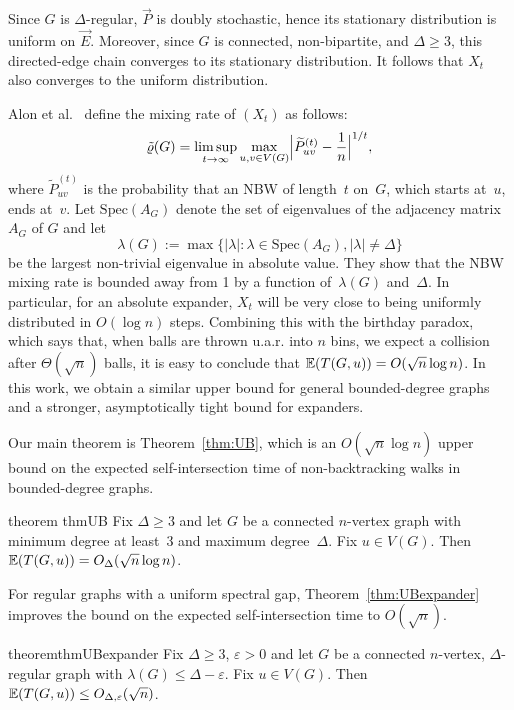 \documentclass[11pt,a4paper]{article}
\theoremstyle{plain}
\newcommand{\Exp}{\mathop{\null\mathbb{E}}}
\let\rho=\varrho
\newcommand{\Ptilde}{\widetilde P}
\let\eps=\varepsilon
\begin{document}
Since \(G\) is \(\Delta\)-regular, \(\vec P\) is doubly stochastic, hence its stationary
distribution is uniform on \(\vec E\). Moreover, since \(G\) is connected,
non-bipartite, and \(\Delta\ge 3\), this directed-edge chain converges to its stationary distribution. It follows that $X_t$ also converges to the uniform distribution.



Alon et al.~\cite{ABLS} define the mixing 
rate of $(X_t)$ as follows:
\begin{equation}\label{eq:intro-mixrate}
\tilde\rho(G)=\limsup_{t\to\infty}\max_{u,v\in V(G)}\Bigl|\Ptilde_{uv}^{(t)}-\frac1n\Bigr|^{1/t},
\end{equation}
where $\Ptilde^{(t)}_{uv}$ is the probability that an NBW of length~$t$ on~$G$, which starts at~$u$, ends at~$v$. Let 
$
\textrm{Spec}(A_G)
$
denote the set of eigenvalues of the adjacency matrix $A_G$ of $G$ and let 
\[
\lambda(G):=\max \{|\lambda|: \lambda\in \textrm{Spec}(A_G), |\lambda|\not=\Delta\}
\]
be the largest non-trivial eigenvalue in absolute value. 
They show that the NBW mixing rate is bounded away from 1 by a function of~$\lambda(G)$ and~$\Delta$. In particular, for an absolute expander, $X_t$ will be very close to being uniformly distributed in $O(\log n)$ steps. Combining this with the birthday paradox, which says that, when balls are thrown u.a.r.\null{} into $n$ bins, we expect a collision after $\Theta(\sqrt{n})$ balls, it is easy to conclude that $\Exp(T(G,u))=O(\sqrt{n}\log n)$.  
In this work, we obtain a similar upper bound for general bounded-degree graphs and a stronger, asymptotically tight bound for expanders.   

Our main theorem is Theorem~\ref{thm:UB}, which is an $ O(\sqrt{n}\log n)$ upper bound on the expected self-intersection time of non-backtracking walks in bounded-degree graphs.

\begin{restatable}{theorem}
{thmUB}\label{thm:UB}
Fix $\Delta \geq 3$ and let $G$ be a connected $n$-vertex graph with minimum degree at least~$3$ and maximum degree~$\Delta$. Fix $u\in V(G)$. Then $\Exp(T(G,u)) = O_\Delta(\sqrt{n} \log n)$.
\end{restatable}



 
For regular graphs with a uniform spectral gap,
Theorem~\ref{thm:UBexpander} improves the bound on the expected self-intersection time to $O(\sqrt{n})$. 


\begin{restatable}{theorem}{thmUBexpander}
\label{thm:UBexpander}
Fix \(\Delta\ge 3\), \(\varepsilon>0\) and let \(G\) be a connected $n$-vertex, \(\Delta\)-regular graph with 
$
\lambda(G)\le \Delta
-\varepsilon$.
Fix $u\in V(G)$. Then 
$\Exp(T(G,u)) \leq O_{\Delta,\eps}(\sqrt{n})$.
\end{restatable}
\end{document}
